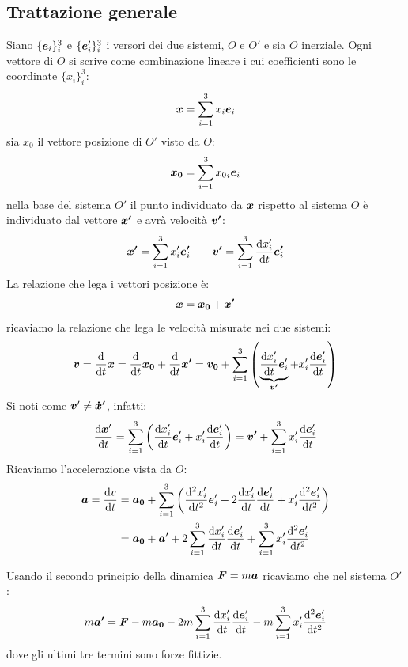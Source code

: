 \subsection{Trattazione generale}
Siano $\{\boldsymbol{e}_i\}_i^3$ e $\{\boldsymbol{e}'_i\}_i^3$ i versori dei due sistemi, $O$ e $O'$ e sia $O$ inerziale. Ogni vettore di $O$ si scrive come combinazione lineare i cui coefficienti sono le coordinate $\{x_i\}_i^3$:
\[
  \boldsymbol{x}=\sum_{i=1}^3 x_i\boldsymbol{e}_i
\]
sia $x_0$ il vettore posizione di $O'$ visto da $O$:
\[
  \boldsymbol{x_0}=\sum_{i=1}^3 {x_0}_i \boldsymbol{e}_i
\]
nella base del sistema $O'$ il punto individuato da $\boldsymbol{x}$ rispetto al sistema $O$ è individuato dal vettore $\boldsymbol{x'}$ e avrà velocità $\boldsymbol{v'}$:
\[
  \boldsymbol{x'}=\sum_{i=1}^3 x'_i\boldsymbol{e'}_i \qquad \boldsymbol{v'}=\sum_{i=1}^3 \frac{\mathrm{d} x'_i}{\mathrm{d} t}\boldsymbol{e'}_i
\]
La relazione che lega i vettori posizione è:
\[
  \boldsymbol{x} = \boldsymbol{x_0}+\boldsymbol{x'}
\]
ricaviamo la relazione che lega le velocità misurate nei due sistemi:
\begin{equation}
  \boldsymbol{v}=\frac{\mathrm{d}}{\mathrm{d} t}\boldsymbol{x}=\frac{\mathrm{d}}{\mathrm{d} t}\boldsymbol{x_0}+\frac{\mathrm{d}}{\mathrm{d} t}\boldsymbol{x'}=\boldsymbol{v_0}+\sum_{i=1}^3\left(\underbrace{\frac{\mathrm{d} x'_i}{\mathrm{d} t}\boldsymbol{e}'_i}_{\boldsymbol{v'}}+x'_i\frac{\mathrm{d} \boldsymbol{e}'_i}{\mathrm{d} t}\right)
  \label{eq:forze_apperenti_gen_v}
\end{equation}
Si noti come $\boldsymbol{v}'\neq \boldsymbol{\dot x'}$, infatti:
\[
  \frac{\mathrm{d}\boldsymbol{x}'}{\mathrm{d} t} = \sum_{i=1}^3\left(\frac{\mathrm{d} x'_i}{\mathrm{d} t}\boldsymbol{e}'_i+x'_i\frac{\mathrm{d} \boldsymbol{e}'_i}{\mathrm{d} t}\right) = \boldsymbol{v'} + \sum_{i=1}^3 x'_i\frac{\mathrm{d} \boldsymbol{e}'_i}{\mathrm{d} t}
\]
Ricaviamo l'accelerazione vista da $O$:
\begin{equation}
  \begin{split}
    \boldsymbol{a} = \frac{\mathrm{d} v}{\mathrm{d} t} &= \boldsymbol{a_0}+\sum_{i=1}^3\left(\frac{\mathrm{d}^2 x'_i}{\mathrm{d} t^2}\boldsymbol{e}'_i
    +2\frac{\mathrm{d} x'_i}{\mathrm{d} t}\frac{\mathrm{d} \boldsymbol{e}'_i}{\mathrm{d} t}
    +x'_i\frac{\mathrm{d}^2 \boldsymbol{e}'_i}{\mathrm{d} t^2}\right) \\
    &= \boldsymbol{a_0} + \boldsymbol{a}'
    +2\sum_{i=1}^3 \frac{\mathrm{d} x'_i}{\mathrm{d} t}\frac{\mathrm{d} \boldsymbol{e}'_i}{\mathrm{d} t} + \sum_{i=1}^3 x'_i\frac{\mathrm{d}^2 \boldsymbol{e}'_i}{\mathrm{d} t^2}
  \end{split}
  \label{eq:fittizie_gen_a}
\end{equation}

Usando il secondo principio della dinamica $\boldsymbol{F}=m\boldsymbol{a}$ ricaviamo che nel sistema $O'$:
\begin{equation}
  m \boldsymbol{a'} = \boldsymbol{F} - m\boldsymbol{a_0}
  -2m \sum_{i=1}^3 \frac{\mathrm{d} x'_i}{\mathrm{d} t}\frac{\mathrm{d} \boldsymbol{e}'_i}{\mathrm{d} t} -m \sum_{i=1}^3 x'_i\frac{\mathrm{d}^2 \boldsymbol{e}'_i}{\mathrm{d} t^2}
  \label{eq:fittizie_gen_f}
\end{equation}
dove gli ultimi tre termini sono forze fittizie.

